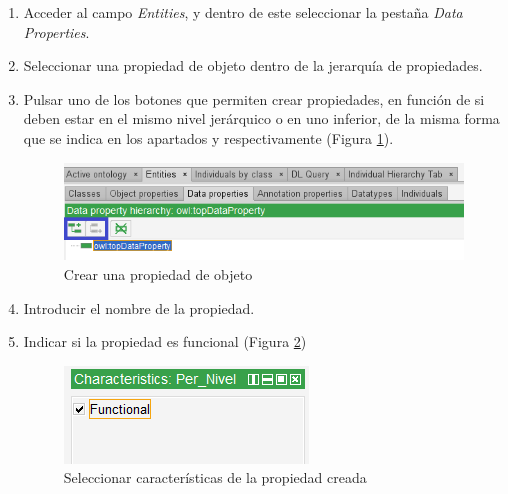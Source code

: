 \begin{enumerate}
    \item Acceder al campo \textit{Entities}, y dentro de este seleccionar la pestaña \textit{Data Properties}.
    \item Seleccionar una propiedad de objeto dentro de la jerarquía de propiedades.
    \newpage
    \item Pulsar uno de los botones que permiten crear propiedades, en función de si deben estar en el mismo nivel jerárquico o 
    en uno inferior, de la misma forma que se indica en los apartados  y 
    respectivamente (Figura \ref*{CreateDataProp_1}).
    
    \begin{figure}[H]
        \centering
        \includegraphics[scale=0.6]{Figures/Protege/CreateDataProp_1.png}
        \caption{Crear una propiedad de objeto}
        \label{CreateDataProp_1}
    \end{figure}

    \item Introducir el nombre de la propiedad.
    \item Indicar si la propiedad es funcional (Figura \ref*{CreateDataProp_2})
    \begin{figure}[H]
        \centering
        \includegraphics[scale=0.6]{Figures/Protege/CreateDataProp_2.png}
        \caption{Seleccionar características de la propiedad creada}
        \label{CreateDataProp_2}
    \end{figure}


\end{enumerate}

